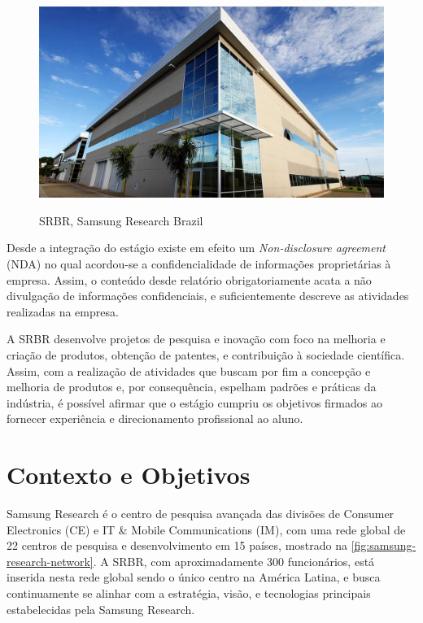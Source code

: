 \documentclass[
	12pt,				%
    oneside,			%
	a4paper,			%
	english,			%
	french,				%
	spanish,			%
	brazil				%
	]{abntex2}
\begin{document}
\begin{figure}[H]
  \centering
  \includegraphics[width=400pt]{images/srbr-image.jpg}\\
  \caption[SRBR, Samsung Research Brazil]{SRBR, Samsung Research Brazil}
  \label{fig:SRBR}
\end{figure}

Desde a integração do estágio existe em efeito um \textit{Non-disclosure agreement} (NDA) no qual acordou-se a confidencialidade de informações proprietárias à empresa. Assim, o conteúdo desde relatório obrigatoriamente acata a não divulgação de informações confidenciais, e suficientemente descreve as atividades realizadas na empresa.

A SRBR desenvolve projetos de pesquisa e inovação com foco na melhoria e criação de produtos, obtenção de patentes, e contribuição à sociedade científica. Assim, com a realização de atividades que buscam por fim a concepção e melhoria de produtos e, por consequência, espelham padrões e práticas da indústria, é possível afirmar que o estágio cumpriu os objetivos firmados ao fornecer experiência e direcionamento profissional ao aluno.

\section{Contexto e Objetivos}

Samsung Research é o centro de pesquisa avançada das divisões de Consumer Electronics (CE) e IT \& Mobile Communications (IM), com uma rede global de 22 centros de pesquisa e desenvolvimento em 15 países, mostrado na \autoref{fig:samsung-research-network}. A SRBR, com aproximadamente 300 funcionários, está inserida nesta rede global sendo o único centro na América Latina, e busca continuamente se alinhar com a estratégia, visão, e tecnologias principais estabelecidas pela Samsung Research.
\end{document}
